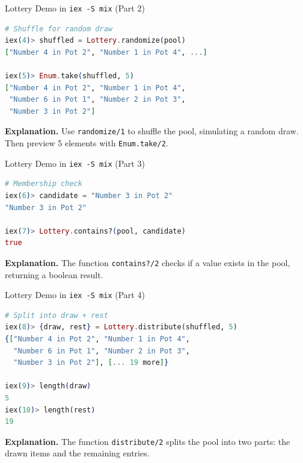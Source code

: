 \documentclass[aspectratio=169, table]{beamer}
\begin{document}
\begin{frame}[fragile]{Lottery Demo in \texttt{iex -S mix} (Part 2)}
\vspace{20pt}
\begin{lstlisting}[language=Elixir]
# Shuffle for random draw
iex(4)> shuffled = Lottery.randomize(pool)
["Number 4 in Pot 2", "Number 1 in Pot 4", ...]

iex(5)> Enum.take(shuffled, 5)
["Number 4 in Pot 2", "Number 1 in Pot 4",
 "Number 6 in Pot 1", "Number 2 in Pot 3",
 "Number 3 in Pot 2"]
\end{lstlisting}

\textbf{Explanation.}  
Use \texttt{randomize/1} to shuffle the pool, simulating  
a random draw. Then preview 5 elements with \texttt{Enum.take/2}.  
\end{frame}

\begin{frame}[fragile]{Lottery Demo in \texttt{iex -S mix} (Part 3)}
\vspace{20pt}
\begin{lstlisting}[language=Elixir]
# Membership check
iex(6)> candidate = "Number 3 in Pot 2"
"Number 3 in Pot 2"

iex(7)> Lottery.contains?(pool, candidate)
true
\end{lstlisting}

\textbf{Explanation.}  
The function \texttt{contains?/2} checks if a value exists  
in the pool, returning a boolean result.  
\end{frame}

\begin{frame}[fragile]{Lottery Demo in \texttt{iex -S mix} (Part 4)}
\vspace{20pt}
\begin{lstlisting}[language=Elixir]
# Split into draw + rest
iex(8)> {draw, rest} = Lottery.distribute(shuffled, 5)
{["Number 4 in Pot 2", "Number 1 in Pot 4",
  "Number 6 in Pot 1", "Number 2 in Pot 3",
  "Number 3 in Pot 2"], [... 19 more]}

iex(9)> length(draw)
5
iex(10)> length(rest)
19
\end{lstlisting}

\textbf{Explanation.}  
The function \texttt{distribute/2} splits the pool into  
two parts: the drawn items and the remaining entries.  
\end{frame}
\end{document}
